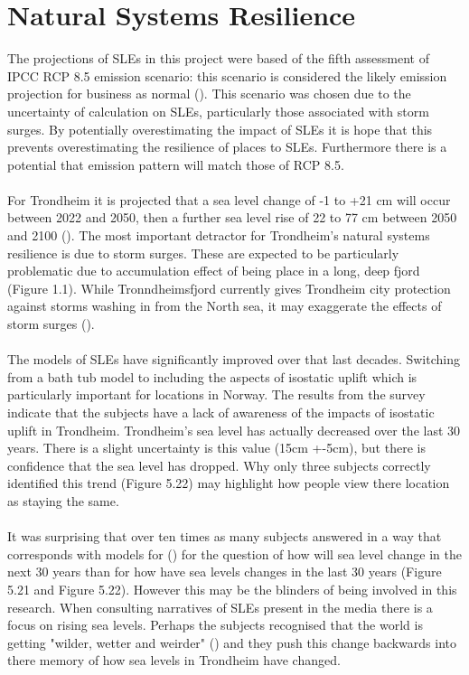 \section{Natural Systems Resilience}
The projections of SLEs in this project were based of the fifth assessment of IPCC RCP 8.5 emission scenario: this scenario is considered the likely emission projection for business as normal (\cite{hanssen-bauer_climate_2017}). This scenario was chosen due to the uncertainty of calculation on SLEs, particularly those associated with storm surges. By potentially overestimating the impact of SLEs it is hope that this prevents overestimating the resilience of places to SLEs. Furthermore there is a potential that emission pattern will match those of RCP 8.5. 
\paragraph{}

For Trondheim it is projected that a sea level change of -1 to +21 cm will occur between 2022 and 2050, then a further sea level rise of 22 to 77 cm between 2050 and 2100 (\cite{hanssen_saksframlegg_2013}). The most important detractor for Trondheim's natural systems resilience is due to storm surges. These are expected to be particularly problematic due to accumulation effect of being place in a long, deep fjord (Figure 1.1). While Tronndheimsfjord currently gives Trondheim city protection against storms washing in from the North sea, it may exaggerate the effects of storm surges (\cite{hanssen_saksframlegg_2013}). 
\paragraph{}
The models of SLEs have significantly improved over that last decades. Switching from a bath tub model to including the aspects of isostatic uplift which is particularly important for locations in Norway. The results from the survey indicate that the subjects have a lack of awareness of the impacts of isostatic uplift in Trondheim. Trondheim's sea level has actually decreased over the last 30 years. There is a slight uncertainty is this value (15cm +-5cm), but there is confidence that the sea level has dropped. Why only three subjects correctly identified this trend (Figure 5.22) may highlight how people view there location as staying the same.

\paragraph{}
It was surprising that over ten times as many subjects answered in a way that corresponds with models for (\cite{kartverket_se_2020}) for the question of how will sea level change in the next 30 years than for how have sea levels changes in the last 30 years (Figure 5.21 and Figure 5.22). However this may be the blinders of being involved in this research. When consulting narratives of SLEs present in the media there is a focus on rising sea levels. Perhaps the subjects recognised that the world is getting "wilder, wetter and weirder" (\cite{rod_integrated_2012}) and they push this change backwards into there memory of how sea levels in Trondheim have changed. 
